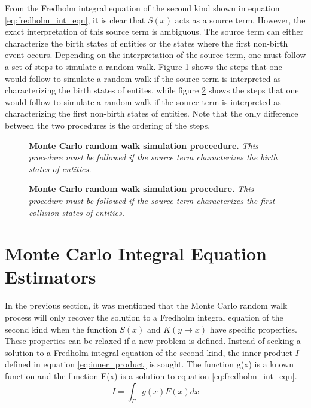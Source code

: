 From the Fredholm integral equation of the second kind shown in equation
\ref{eq:fredholm_int_eqn}, it is clear that $S(x)$ acts as a source term.
However, the exact interpretation of this source term is ambiguous. The
source term can either characterize the birth states of entities or the
states where the first non-birth event occurs. Depending on the interpretation 
of the source term, one must follow a set of steps to simulate a random walk.
Figure \ref{fig:random_walk_process_1} shows the steps that one would follow
to simulate a random walk if the source term is interpreted as characterizing
the birth states of entites, while figure \ref{fig:random_walk_process_2}
shows the steps that one would follow to simulate a random walk if the
source term is interpreted as characterizing the first non-birth states of
entities. Note that the only difference between the two procedures is the
ordering of the steps.
\begin{figure}[t!]
  \begin{center}
  \end{center}
  \caption{\textbf{Monte Carlo random walk simulation proceedure.} \textit{This
      procedure must be followed if the source term characterizes the birth
      states of entities.} }
  \label{fig:random_walk_process_1}
\end{figure}
\begin{figure}[t!]
  \begin{center}
  \end{center}
  \caption{\textbf{Monte Carlo random walk simulation procedure.} \textit{This
      procedure must be followed if the source term characterizes the first
      collision states of entities.} }
  \label{fig:random_walk_process_2}
\end{figure}

\section{Monte Carlo Integral Equation Estimators}
\label{sec:mc_int_eqn_estimators}
In the previous section, it was mentioned that the Monte Carlo random walk
process will only recover the solution to a Fredholm integral equation of 
the second kind when the function $S(x)$ and $K(y \to x)$ have specific
properties. These properties can be relaxed if a new problem is defined. 
Instead of seeking a solution to a Fredholm integral equation of the second 
kind, the inner product $I$ defined in equation \ref{eq:inner_product} is 
sought. The function g(x) is a known function and the function F(x) is a 
solution to equation \ref{eq:fredholm_int_eqn}. 
\begin{equation}
  I = \int_{\Gamma} g(x)F(x)dx
  \label{eq:inner_product}
\end{equation}

